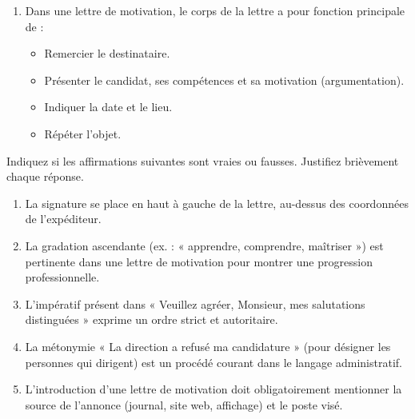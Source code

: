 \documentclass[11pt]{article}
\begin{document}
\begin{exercice}
\begin{enumerate}
\begin{itemize}
        \item[C.] Recevez.
        \item[D.] Recevrez.
    \end{itemize}
    \item Dans une lettre de motivation, le corps de la lettre a pour fonction principale de :
    \begin{itemize}
        \item[A.] Remercier le destinataire.
        \item[B.] Présenter le candidat, ses compétences et sa motivation (argumentation).
        \item[C.] Indiquer la date et le lieu.
        \item[D.] Répéter l'objet.
    \end{itemize}
\end{enumerate}
\end{exercice}

\begin{exercice}
Indiquez si les affirmations suivantes sont vraies ou fausses. Justifiez brièvement chaque réponse.
\begin{enumerate}
    \item La signature se place en haut à gauche de la lettre, au-dessus des coordonnées de l'expéditeur.
    \item La gradation ascendante (ex. : « apprendre, comprendre, maîtriser ») est pertinente dans une lettre de motivation pour montrer une progression professionnelle.
    \item L'impératif présent dans « Veuillez agréer, Monsieur, mes salutations distinguées » exprime un ordre strict et autoritaire.
    \item La métonymie « La direction a refusé ma candidature » (pour désigner les personnes qui dirigent) est un procédé courant dans le langage administratif.
    \item L'introduction d'une lettre de motivation doit obligatoirement mentionner la source de l'annonce (journal, site web, affichage) et le poste visé.
\end{enumerate}
\end{exercice}
\end{document}
